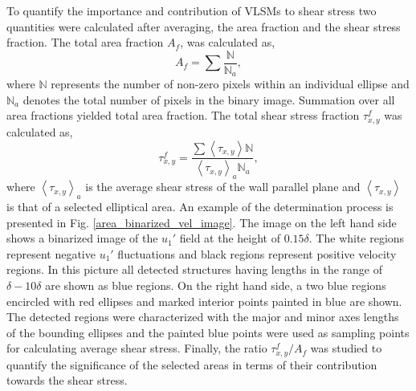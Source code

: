 \documentclass{amsart}
\begin{document}
To quantify the importance and contribution of VLSMs to shear stress two quantities were calculated after averaging, the area fraction and the shear stress fraction. The total area fraction $A_f$, was calculated as, 
\begin{equation*}
		A_f = \sum \frac{\mathbb{N}}{\mathbb{N}_a},
\label{eqn:area_frac_def}        
\end{equation*}
\noindent where $\mathbb{N}$ represents the number of non-zero pixels  within an individual ellipse and $\mathbb{N}_a$ denotes the total number of pixels in the binary image. Summation over all area fractions yielded total area fraction. The total shear stress fraction $\tau_{x,y}^f$ was  calculated as, 
\begin{equation*}
		\tau_{x,y}^f =\frac{\sum \left < \tau_{x,y} \right > \mathbb{N}}{\left < \tau_{x,y}\right >_a\mathbb{N}_a },
\label{eqn:stress_frac_def}             
\end{equation*}
\noindent where $\left < \tau_{x,y}\right >_a$  is the average shear stress of the wall parallel plane and $\left < \tau_{x,y} \right >$ is that of a selected elliptical area.  An example of the determination process is presented in Fig. \ref{area_binarized_vel_image}. The image on the left hand side shows  a binarized image of the $u_{1}'$ field at the height of $0.15\delta$.  The white regions represent negative $u_{1}'$ fluctuations and black regions represent positive velocity regions. In this picture all detected structures having  lengths in the range  of $\delta-10\delta$ are shown as blue regions. On the right hand side, a two blue regions  encircled with red  ellipses and marked interior points painted in blue are shown.  The detected regions were characterized with the major and minor axes lengths of the bounding ellipses and the painted blue points were used as sampling points for calculating average shear stress. Finally, the ratio $\tau_{x,y}^f/A_f$ was studied to quantify the significance of the selected areas in terms of  their contribution towards the shear stress.  
\graphicspath{{chap1Img/}}
\end{document}
